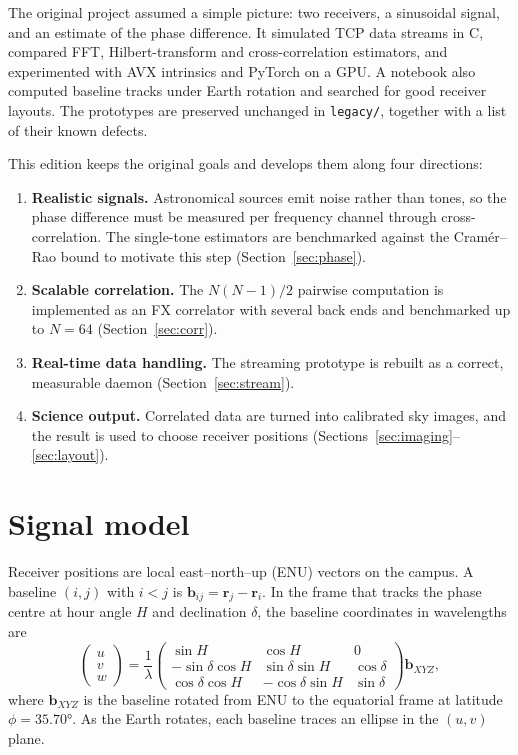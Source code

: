\documentclass[11pt,a4paper]{article}
\begin{document}
The original project assumed a simple picture: two receivers, a sinusoidal signal, and an estimate of
the phase difference. It simulated TCP data streams in C, compared FFT, Hilbert-transform and
cross-correlation estimators, and experimented with AVX intrinsics and PyTorch on a GPU. A notebook
also computed baseline tracks under Earth rotation and searched for good receiver layouts. The
prototypes are preserved unchanged in \texttt{legacy/}, together with a list of their known defects.

This edition keeps the original goals and develops them along four directions:
\begin{enumerate}
  \item \textbf{Realistic signals.} Astronomical sources emit noise rather than tones, so the phase
  difference must be measured per frequency channel through cross-correlation. The single-tone
  estimators are benchmarked against the Cramér--Rao bound to motivate this step
  (Section~\ref{sec:phase}).
  \item \textbf{Scalable correlation.} The $N(N-1)/2$ pairwise computation is implemented as an FX
  correlator with several back ends and benchmarked up to $N=64$ (Section~\ref{sec:corr}).
  \item \textbf{Real-time data handling.} The streaming prototype is rebuilt as a correct,
  measurable daemon (Section~\ref{sec:stream}).
  \item \textbf{Science output.} Correlated data are turned into calibrated sky images, and the result
  is used to choose receiver positions (Sections~\ref{sec:imaging}--\ref{sec:layout}).
\end{enumerate}

\section{Signal model}\label{sec:model}

Receiver positions are local east--north--up (ENU) vectors on the campus. A baseline $(i,j)$ with
$i<j$ is $\mathbf b_{ij} = \mathbf r_j-\mathbf r_i$. In the frame that tracks the phase centre at hour
angle $H$ and declination $\delta$, the baseline coordinates in wavelengths are
\begin{equation}
\begin{pmatrix}u\\v\\w\end{pmatrix}=\frac{1}{\lambda}
\begin{pmatrix}\sin H&\cos H&0\\-\sin\delta\cos H&\sin\delta\sin H&\cos\delta\\
\cos\delta\cos H&-\cos\delta\sin H&\sin\delta\end{pmatrix}\mathbf b_{XYZ},
\end{equation}
where $\mathbf b_{XYZ}$ is the baseline rotated from ENU to the equatorial frame at latitude
$\phi=\ang{35.70}$. As the Earth rotates, each baseline traces an ellipse in the $(u,v)$ plane.
\end{document}
